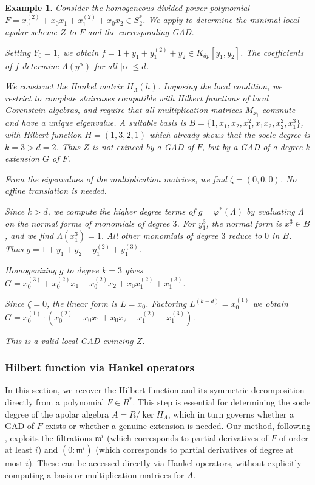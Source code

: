 \documentclass[a4paper,11p]{amsart}
\newtheorem{example0}[defn0]{Example}
\newenvironment{example}{ \begin{example0}\rm}{\end{example0}}
\begin{document}
\begin{example}\label{Ex:GlobalAlg_k>d}
Consider the homogeneous divided power polynomial
$
F = x_0^{(2)} + x_0x_1 + x_1^{(2)} + x_0x_2 \in S_2^*$.
We apply  to determine the minimal local apolar scheme $Z$ to $F$ and the corresponding GAD.

Setting $Y_0=1$, we obtain $
f = 1 + y_1 + y_1^{(2)} + y_2 \in K_{dp}[y_1,y_2]$. The coefficients of $f$ determine $\Lambda(y^\alpha)$ for all $|\alpha|\le d$.

We construct the Hankel matrix $H_\Lambda(h)$.
Imposing the local condition, we restrict to complete staircases compatible with Hilbert functions of local Gorenstein algebras, and require that all multiplication matrices $M_{x_i}$ commute and have a unique eigenvalue.  
A suitable basis is $
B = \{1, x_1, x_2, x_1^2, x_1x_2, x_2^2, x_1^3\}$,
with Hilbert function
$
H = (1,3,2,1)$ which already shows that the socle degree is $k=3 > d=2$. Thus $Z$ is not evinced by a GAD of $F$, but by a GAD of a degree-$k$ extension $G$ of $F$.

From the eigenvalues of the multiplication matrices, we find $\zeta = (0,0,0)$. No affine translation is needed.

Since $k>d$, we compute the higher degree terms of $g=\varphi^*(\Lambda)$ by evaluating $\Lambda$ on the normal forms of monomials of degree $3$.  
For $y_1^3$, the normal form is $x_1^3\in B$, and we find $\Lambda(x_1^3)=1$.  
All other monomials of degree $3$ reduce to $0$ in $B$.  
Thus
$
g = 1 + y_1 + y_2 + y_1^{(2)} + y_1^{(3)}$.

 
Homogenizing $g$ to degree $k=3$ gives
$
G = x_0^{(3)} + x_0^{(2)}x_1 + x_0^{(2)}x_2 + x_0x_1^{(2)} + x_1^{(3)}.$

Since $\zeta=0$, the linear form is $L=x_0$.  
Factoring $L^{(k-d)}=x_0^{(1)}$ we obtain
$G = x_0^{(1)} \cdot \left(x_0^{(2)} + x_0x_1 + x_0x_2 + x_1^{(2)} + x_1^{(3)}\right)$.

This is a valid local GAD evincing $Z$.
\end{example}



\subsubsection{Hilbert function via Hankel operators}
In this section, we recover the Hilbert function and its symmetric decomposition directly from a polynomial $F\in R^*$.
This step is essential for determining the socle degree of the apolar algebra $A=R/\ker H_\Lambda$, which in turn governs whether a GAD of $F$ exists or whether a genuine extension is needed. 
Our method, following \cite[Section~1]{BJPR}, exploits the filtrations $\mathfrak{m}^i$ (which corresponds to partial derivatives of $F$ of order at least $i$) and $(0:\mathfrak{m}^i)$ (which corresponds to partial derivatives of degree at most $i$).  
These can be accessed directly via Hankel operators, without explicitly computing a basis or multiplication matrices for $A$. 
\end{document}
